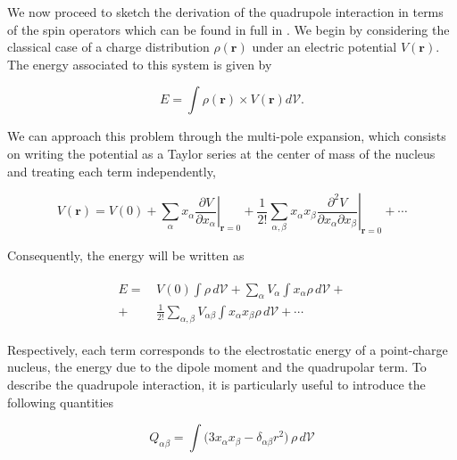 We now proceed to sketch the derivation of the quadrupole interaction in terms of the spin operators which can be found in full in . We begin by considering the classical case of a charge distribution $\rho(\mathbf{r})$ under an electric potential $V(\mathbf{r})$. The energy associated to this system is given by

\begin{equation}
    E = \int \rho(\mathbf{r}) \times V(\mathbf{r}) d\mathcal{V}.
\end{equation}

We can approach this problem through the multi-pole expansion, which consists on writing the potential as a Taylor series at the center of mass of the nucleus and treating each term independently, 

\begin{equation}
V(\mathbf{r}) = V(0) 
+ \sum_{\alpha} x_{\alpha} 
\left. \frac{\partial V}{\partial x_{\alpha}} \right|_{\mathbf{r}=0}
+ \frac{1}{2!} \sum_{\alpha,\beta} x_{\alpha} x_{\beta} 
\left. \frac{\partial^2 V}{\partial x_{\alpha} \partial x_{\beta}} \right|_{\mathbf{r}=0}
+ \cdots
\end{equation}

Consequently, the energy will be written as 

\begin{align}
\begin{split}
E =&\, V(0) \int \rho \, d\mathcal{V} 
+ \sum_{\alpha} V_{\alpha} \int x_{\alpha} \rho \, d\mathcal{V} +\\
+&\, \frac{1}{2!} \sum_{\alpha,\beta} V_{\alpha \beta} \int x_{\alpha} x_{\beta} \rho \, d\mathcal{V} 
+ \cdots
\end{split}
\end{align}

Respectively, each term corresponds to the electrostatic energy of a point-charge nucleus, the energy due to the dipole moment  and the quadrupolar term. To describe the quadrupole interaction, it is particularly useful to introduce the following quantities 

\begin{equation}
    Q_{\alpha \beta} = \int \big( 3 x_{\alpha} x_{\beta} - \delta_{\alpha \beta} r^{2} \big) \, \rho \, d\mathcal{V}
\end{equation}

